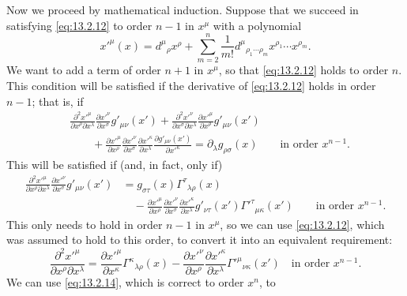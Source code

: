 Now we proceed by mathematical induction. Suppose that we succeed in
satisfying \eqref{eq:13.2.12} to order \(n-1\) in \(x^\mu\) with a
polynomial
\begin{equation}
  x'^\mu(x)
  =
  d^\mu{}_\rho x^\rho
  +\sum_{m=2}^{n}\frac{1}{m!}
  d^\mu{}_{\rho_1\cdots\rho_m}
  x^{\rho_1}\cdots x^{\rho_m}.
  \tag{13.2.14}\label{eq:13.2.14}
\end{equation}
We want to add a term of order \(n+1\) in \(x^\mu\), so that
\eqref{eq:13.2.12} holds to order \(n\). This condition will be satisfied
if the derivative of \eqref{eq:13.2.12} holds in order \(n-1\); that is,
if
\begin{align*}
  &\frac{\partial^2x'^\mu}{\partial x^\rho\partial x^\lambda}
   \frac{\partial x'^\nu}{\partial x^\sigma}g'_{\mu\nu}(x')
  +
  \frac{\partial^2x'^\nu}{\partial x^\sigma\partial x^\lambda}
  \frac{\partial x'^\mu}{\partial x^\rho}g'_{\mu\nu}(x')
  \\
  &\qquad
  +
  \frac{\partial x'^\mu}{\partial x^\rho}
  \frac{\partial x'^\nu}{\partial x^\sigma}
  \frac{\partial x'^\kappa}{\partial x^\lambda}
  \frac{\partial g'_{\mu\nu}(x')}{\partial x'^\kappa}
  =
  \partial_\lambda g_{\rho\sigma}(x)
  \qquad\text{in order \(x^{n-1}\)}.
\end{align*}
This will be satisfied if (and, in fact, only if)
\begin{align*}
  \frac{\partial^2x'^\mu}{\partial x^\rho\partial x^\lambda}
  \frac{\partial x'^\nu}{\partial x^\sigma}g'_{\mu\nu}(x')
  &=
  g_{\sigma\tau}(x)\Gamma^\tau{}_{\lambda\rho}(x)
  \\
  &\quad
  -
  \frac{\partial x'^\mu}{\partial x^\rho}
  \frac{\partial x'^\nu}{\partial x^\sigma}
  \frac{\partial x'^\kappa}{\partial x^\lambda}
  g'_{\nu\tau}(x')\Gamma'^\tau{}_{\mu\kappa}(x')
  \qquad\text{in order \(x^{n-1}\)}.
\end{align*}
This only needs to hold in order \(n-1\) in \(x^\mu\), so we can use
\eqref{eq:13.2.12}, which was assumed to hold to this order, to convert it
into an equivalent requirement:
\begin{equation}
  \frac{\partial^2x'^\mu}{\partial x^\rho\partial x^\lambda}
  =
  \frac{\partial x'^\mu}{\partial x^\kappa}
  \Gamma^\kappa{}_{\lambda\rho}(x)
  -
  \frac{\partial x'^\nu}{\partial x^\rho}
  \frac{\partial x'^\kappa}{\partial x^\lambda}
  \Gamma'^\mu{}_{\nu\kappa}(x')
  \quad\text{in order \(x^{n-1}\)}.
  \tag{13.2.15}\label{eq:13.2.15}
\end{equation}
We can use \eqref{eq:13.2.14}, which is correct to order \(x^n\), to
